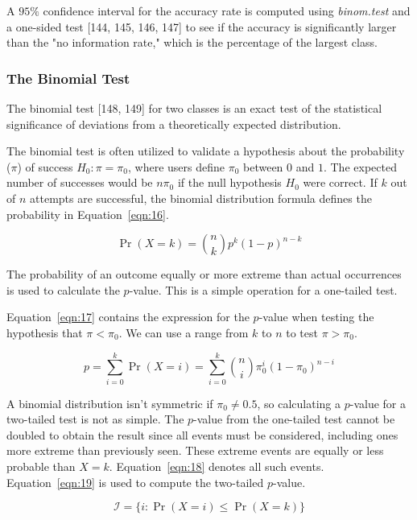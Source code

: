 \documentclass[sn-mathphys-num]{sn-jnl}%
\begin{document}
A $95\%$ confidence interval for the accuracy rate is computed using \textit{binom.test} and a one-sided test [144, 145, 146, 147] to see if the accuracy is significantly larger than the "no information rate," which is the percentage of the largest class.

\subsubsection{The Binomial Test}

The binomial test [148, 149] for two classes is an exact test of the statistical significance of deviations from a theoretically expected distribution.

The binomial test is often utilized to validate a hypothesis about the probability ($\pi$) of success 
$H_{0}\colon \pi =\pi_{0}$, where users define $\pi_{0}$ between $0$ and $1$. The expected number of successes would be $n\pi_{0}$ if the null hypothesis $H_{0}$ were correct. If $k$ out of $n$ attempts are successful, the binomial distribution formula defines the probability in Equation~\ref{eqn:16}.

\begin{equation}
	\Pr(X=k)={\binom{n}{k}}p^{k}(1-p)^{n-k}
	\label{eqn:16}
\end{equation}

The probability of an outcome equally or more extreme than actual occurrences is used to calculate the $p$-value. This is a simple operation for a one-tailed test. 

Equation~\ref{eqn:17} contains the expression for the $p$-value when testing the hypothesis that $\pi <\pi_{0}$. We can use a range from $k$ to $n$ to test $\pi >\pi_{0}$.

\begin{equation}
	p=\sum_{i=0}^{k}\Pr(X=i)=\sum_{i=0}^{k}{\binom{n}{i}}\pi_{0}^{i}(1-\pi_{0})^{n-i}
	\label{eqn:17}
\end{equation}

A binomial distribution isn't symmetric if $\pi_{0}\neq 0.5$, so calculating a $p$-value for a two-tailed test is not as simple. The $p$-value from the one-tailed test cannot be doubled to obtain the result since all events must be considered, including ones more extreme than previously seen. These extreme events are equally or less probable than $X=k$. Equation~\ref{eqn:18} denotes all such events. Equation~\ref{eqn:19} is used to compute the two-tailed $p$-value.

\begin{equation}
	{\mathcal{I}}=\{i\colon \Pr(X=i)\leq \Pr(X=k)\}
	\label{eqn:18}
\end{equation}
\end{document}
